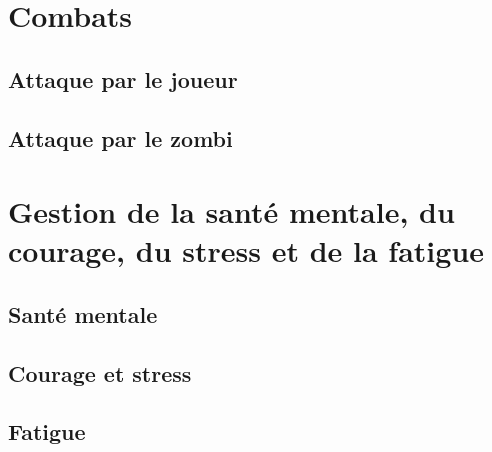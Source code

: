 \section{Combats}
\subsection{Attaque par le joueur}
\subsection{Attaque par le zombi}

\section{Gestion de la santé mentale, du courage, du stress et de la fatigue}
\subsection{Santé mentale}
\subsection{Courage et stress}
\subsection{Fatigue}
